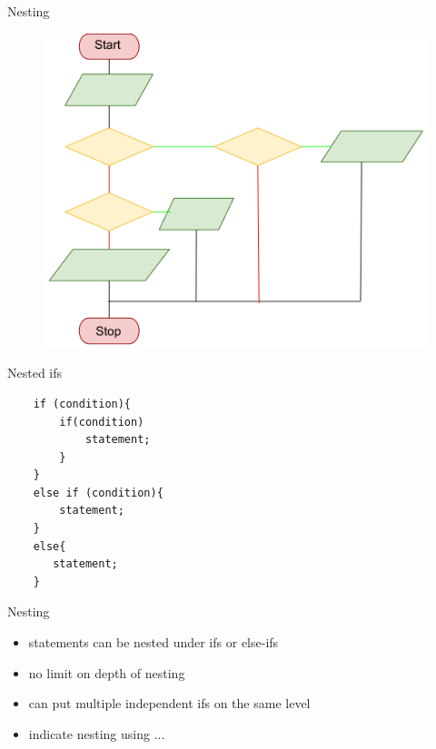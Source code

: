 \documentclass[xcolor={dvipsnames}]{beamer}
\begin{document}
\begin{frame}{Nesting}
\begin{center}	
	\begin{figure}
		\includegraphics[width=.9\textwidth]{nesting}
	\end{figure}
	\end{center}
\end{frame}

\begin{frame}[fragile]{Nested ifs}
\begin{verbatim}
    if (condition){
        if(condition)
            statement;
        }
    }
    else if (condition){
        statement;
    }
    else{
       statement;
    }
\end{verbatim}
\end{frame}

\begin{frame}{Nesting}
	\begin{itemize}
		\item statements can be nested under ifs or else-ifs
		\item no limit on depth of nesting
		\item can put multiple independent ifs on the same level
		\item indicate nesting using { ...}
	\end{itemize}
\end{frame}
\end{document}
